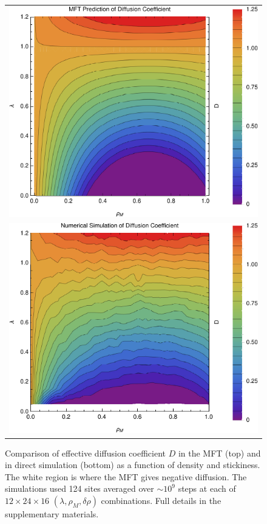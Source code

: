 \documentclass[
reprint,
 amsmath,amssymb,
 aps,
 prl,
]{revtex4-1}
\begin{document}
\begin{figure}[h!]
\vspace{1em}
\caption{\label{fig:diffCoef}
Comparison of effective diffusion coefficient $D$ in the MFT (top) and in direct simulation (bottom) as a function of density and stickiness.
The white region is where the MFT gives negative diffusion. The simulations used 124 sites averaged over $\sim 10^9$ steps at each of $12 \times 24 \times 16 $ $(\lambda, \rho_M, \delta \rho)$ combinations.
Full details in the supplementary materials.}

\begin{center}
 \begin{tabular}{c}
    \includegraphics[width=0.98\linewidth]{newAnalFlow} \\
    \includegraphics[width=0.98\linewidth]{newDataFlow}
    \end{tabular}
\end{center}
    \vspace{-2em}
\end{figure}
\end{document}
